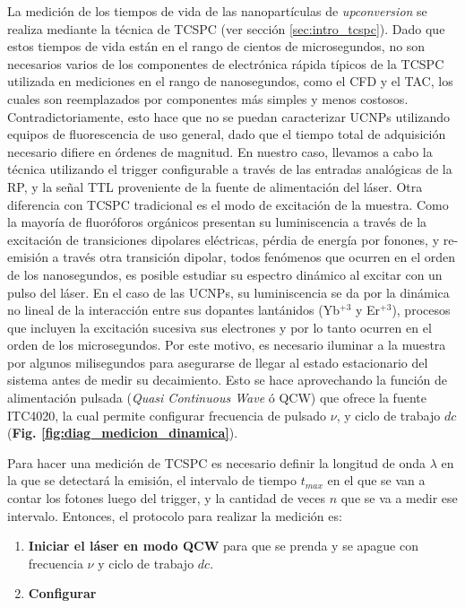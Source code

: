 La medición de los tiempos de vida de las nanopartículas de \textit{upconversion} se realiza mediante la técnica de TCSPC (ver sección \ref{sec:intro_tcspc}).
Dado que estos tiempos de vida están en el rango de cientos de microsegundos, no son necesarios varios de los componentes de electrónica rápida típicos de la TCSPC utilizada en mediciones en el rango de nanosegundos, como el CFD y el TAC, los cuales son reemplazados por componentes más simples y menos costosos.
Contradictoriamente, esto hace que no se puedan caracterizar UCNPs utilizando equipos de fluorescencia de uso general, dado que el tiempo total de adquisición necesario difiere en órdenes de magnitud.
En nuestro caso, llevamos a cabo la técnica utilizando el trigger configurable a través de las entradas analógicas de la RP, y la señal TTL proveniente de la fuente de alimentación del láser.
Otra diferencia con TCSPC tradicional es el modo de excitación de la muestra.
Como la mayoría de fluoróforos orgánicos presentan su luminiscencia a través de la excitación de transiciones dipolares eléctricas, pérdia de energía por fonones, y re-emisión a través otra transición dipolar, todos fenómenos que ocurren en el orden de los nanosegundos, es posible estudiar su espectro dinámico al excitar con un pulso del láser.
En el caso de las UCNPs, su luminiscencia se da por la dinámica no lineal de la interacción entre sus dopantes lantánidos (Yb$^{+3}$ y Er$^{+3}$), procesos que incluyen la excitación sucesiva sus electrones y por lo tanto ocurren en el orden de los microsegundos.
Por este motivo, es necesario iluminar a la muestra por algunos milisegundos para asegurarse de llegar al estado estacionario del sistema antes de medir su decaimiento.
Esto se hace aprovechando la función de alimentación pulsada (\textit{Quasi Continuous Wave} ó QCW) que ofrece la fuente ITC4020, la cual permite configurar frecuencia de pulsado $\nu$, y ciclo de trabajo $dc$ (\textbf{Fig. \ref{fig:diag_medicion_dinamica}}).

Para hacer una medición de TCSPC es necesario definir la longitud de onda $\lambda$ en la que se detectará la emisión, el intervalo de tiempo $t_{max}$ en el que se van a contar los fotones luego del trigger, y la cantidad de veces $n$ que se va a medir ese intervalo.
Entonces, el protocolo para realizar la medición es:

\begin{enumerate}
     \item \textbf{Iniciar el láser en modo QCW} para que se prenda y se apague con frecuencia $\nu$ y ciclo de trabajo $dc$.
     \item \textbf{Configurar }
\end{enumerate}


